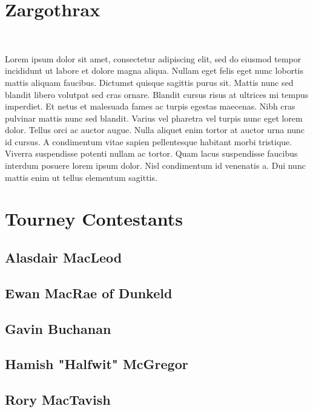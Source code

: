 \section*{Zargothrax}\label{char:Zargothrax}%
\vspace*{-2.4\fontdimen6\font}\hfill\\\begin{multicols}{2}%
	{\noindent\entryfont Lorem ipsum dolor sit amet, consectetur adipiscing elit, sed do eiusmod tempor incididunt ut labore et dolore magna aliqua. Nullam eget felis eget nunc lobortis mattis aliquam faucibus. Dictumst quisque sagittis purus sit. Mattis nunc sed blandit libero volutpat sed cras ornare. Blandit cursus risus at ultrices mi tempus imperdiet. Et netus et malesuada fames ac turpis egestas maecenas. Nibh cras pulvinar mattis nunc sed blandit. Varius vel pharetra vel turpis nunc eget lorem dolor. Tellus orci ac auctor augue. Nulla aliquet enim tortor at auctor urna nunc id cursus. A condimentum vitae sapien pellentesque habitant morbi tristique. Viverra suspendisse potenti nullam ac tortor. Quam lacus suspendisse faucibus interdum posuere lorem ipsum dolor. Nisl condimentum id venenatis a. Dui nunc mattis enim ut tellus elementum sagittis.}
\end{multicols}%
%
\twocolumn
\clearpage
\section*{Tourney Contestants}%
\subsection{Alasdair MacLeod}\label{char:AlasdairMacLeod}

\vfill\eject
\subsection{Ewan MacRae of Dunkeld}\label{char:EwanMacRae}

\vfill\eject
\subsection{Gavin Buchanan}\label{char:GavinBuchanan}

\vfill\eject
\subsection{Hamish "Halfwit" McGregor}\label{char:HamishMcGregor}

\vfill\eject
\subsection{Rory MacTavish}\label{char:RoryMacTavish}
